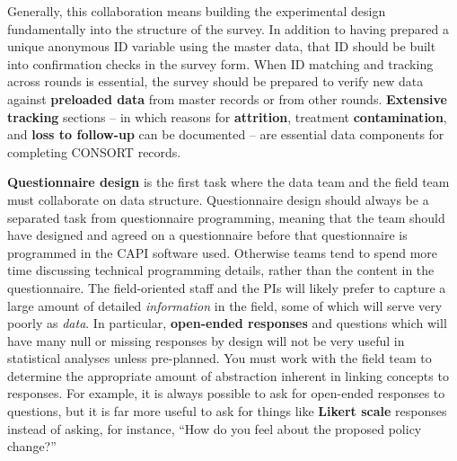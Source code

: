 Generally, this collaboration means building the experimental design
fundamentally into the structure of the survey.
In addition to having prepared a unique anonymous ID variable
using the master data,
that ID should be built into confirmation checks in the survey form.
When ID matching and tracking across rounds is essential,
the survey should be prepared to verify new data
against \textbf{preloaded data} from master records or from other rounds.
\textbf{Extensive tracking} sections --
in which reasons for \textbf{attrition}, treatment \textbf{contamination}, and
\textbf{loss to follow-up} can be documented --
are essential data components for completing CONSORT records.

\textbf{Questionnaire design}
is the first task where the data team
and the field team must collaborate on data structure.
Questionnaire design should always be a separated task from questionnaire programming, meaning
that the team should have designed and agreed on a questionnaire before that questionnaire is
programmed in the CAPI software used. Otherwise teams tend to spend more time discussing technical
programming details, rather than the content in the questionnaire. The field-oriented staff and the
PIs will likely prefer to capture a large amount of detailed \textit{information}
in the field, some of which will serve very poorly as \textit{data}.
In particular, \textbf{open-ended responses} and questions which will have
many null or missing responses by design will not be very useful
in statistical analyses unless pre-planned.
You must work with the field team to determine the appropriate amount
of abstraction inherent in linking concepts to responses.
For example, it is always possible to ask for open-ended responses to questions,
but it is far more useful to ask for things like \textbf{Likert scale} responses
instead of asking, for instance,
``How do you feel about the proposed policy change?''

